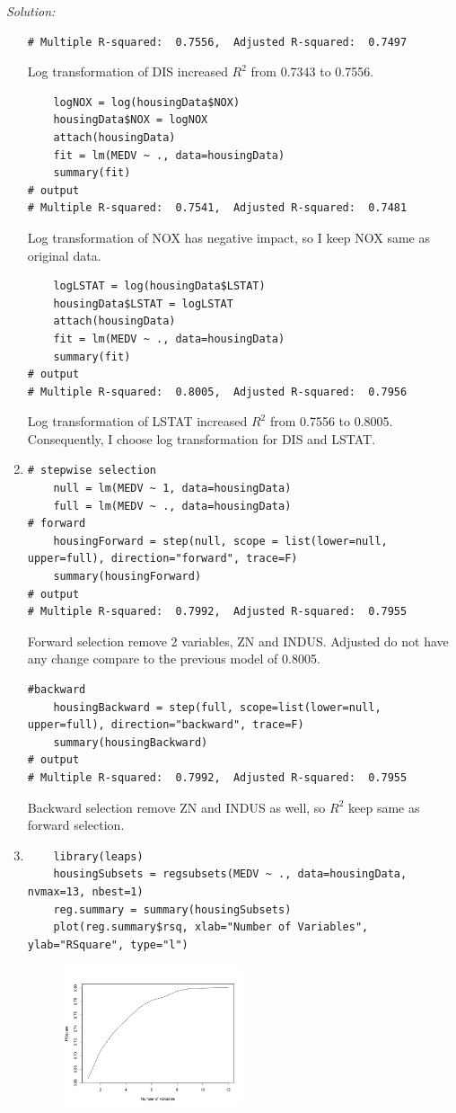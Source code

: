\documentclass{article}
\newenvironment{solution}
    {\textit{Solution:}}
    {}
\begin{document}
\begin{solution}
\begin{enumerate}
\begin{lstlisting}
# Multiple R-squared:  0.7556,	Adjusted R-squared:  0.7497 
	\end{lstlisting}
Log transformation of DIS increased $R^2$ from 0.7343 to 0.7556.
	\begin{lstlisting}
	logNOX = log(housingData$NOX)
	housingData$NOX = logNOX
	attach(housingData)
	fit = lm(MEDV ~ ., data=housingData)
	summary(fit)
# output
# Multiple R-squared:  0.7541,	Adjusted R-squared:  0.7481 
	\end{lstlisting}
Log transformation of NOX has negative impact, so I keep NOX same as original data.
	\begin{lstlisting}
	logLSTAT = log(housingData$LSTAT) 
	housingData$LSTAT = logLSTAT
	attach(housingData)
	fit = lm(MEDV ~ ., data=housingData)
	summary(fit)
# output
# Multiple R-squared:  0.8005,	Adjusted R-squared:  0.7956 
	\end{lstlisting}
Log transformation of LSTAT increased $R^2$ from 0.7556 to 0.8005. Consequently, I choose log transformation for DIS and LSTAT.
	\item\mbox{}
	\begin{lstlisting}
# stepwise selection
	null = lm(MEDV ~ 1, data=housingData)
	full = lm(MEDV ~ ., data=housingData)
# forward
	housingForward = step(null, scope = list(lower=null, upper=full), direction="forward", trace=F)
	summary(housingForward)
# output
# Multiple R-squared:  0.7992,	Adjusted R-squared:  0.7955
	\end{lstlisting}
Forward selection remove 2 variables, ZN and INDUS. Adjusted do not have any change compare to the previous model of 0.8005.
\newpage
	\begin{lstlisting}
#backward
	housingBackward = step(full, scope=list(lower=null, upper=full), direction="backward", trace=F)
	summary(housingBackward)
# output
# Multiple R-squared:  0.7992,	Adjusted R-squared:  0.7955
	\end{lstlisting}
Backward selection remove ZN and INDUS as well, so $R^2$ keep same as forward selection.
	\item\mbox{}
	\begin{lstlisting}
	library(leaps)
	housingSubsets = regsubsets(MEDV ~ ., data=housingData, nvmax=13, nbest=1)
	reg.summary = summary(housingSubsets)
	plot(reg.summary$rsq, xlab="Number of Variables", ylab="RSquare", type="l")
	\end{lstlisting}
	\begin{figure}[h]
		\centering
		\includegraphics[width=0.5\textwidth]{figure10_Rplot.jpeg}

\end{figure}
\end{enumerate}
\end{solution}
\end{document}
